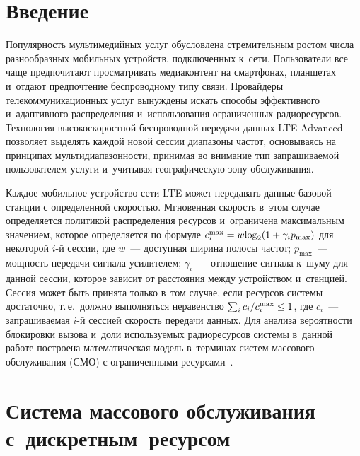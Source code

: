 \begin{multicols}{2}

\label{st\stat}

\section{Введение}
    
  Популярность мультимедийных услуг обуслов\-ле\-на стремительным ростом 
числа разнообразных мобильных устройств, подключенных к~сети. 
Пользователи все чаще предпочитают просматривать медиаконтент на 
смартфонах, планшетах и~отдают предпочтение беспроводному типу связи. 
Провайдеры телекоммуникационных услуг вынуждены искать способы 
эффективного и~адаптивного распределения и~использования ограниченных 
радиоресурсов. Технология высокоскоростной беспроводной передачи данных 
LTE-Advanced позволяет выделять каждой новой сессии диапазоны частот, 
основываясь на принципах мультидиапазонности, принимая во внимание тип 
запрашиваемой пользователем услуги и~учитывая географическую зону 
обслуживания. 
  
  Каждое мобильное устройство сети LTE может передавать данные базовой 
станции с определенной скоростью. Мгновенная скорость в~этом случае 
определяется политикой распределения ресурсов и~ограничена максимальным 
значением, которое определяется по формуле $c_i^{\max} \hm= 
w\mathrm{log}_2(1\hm+\gamma_ip_{\max})$ для некоторой $i$-й сес\-сии, где 
$w$~--- доступная ширина полосы частот; $p_{\max}$~--- мощность передачи 
сигнала усилителем; $\gamma_i$~--- отношение сигнала к~шуму для данной 
сессии, которое зависит от расстояния между устройством и~станцией. Сессия 
может быть принята только в~том случае, если ресурсов системы достаточно, т.\,е.\ 
должно выполняться неравенство $\sum\nolimits_i c_i/c_i^{\max}\hm\leq 1$, 
где $c_i$~--- запрашиваемая $i$-й сессией скорость передачи данных. Для 
анализа вероятности блокировки вызова и~доли используемых радиоресурсов 
системы в~данной работе построена математическая модель в~терминах систем 
массового обслуживания (СМО) с ограниченными ресурсами~\cite{5-v}.

\vspace*{-6pt}

\section{Система массового обслуживания с~дискретным~ресурсом}

\vspace*{-2pt}
    

\end{multicols}

